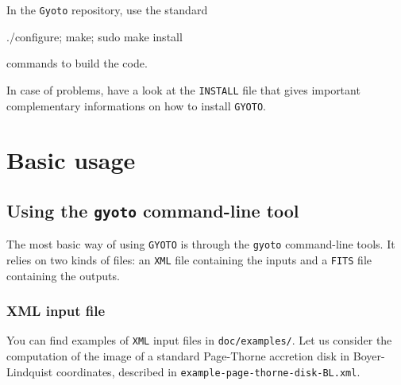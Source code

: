 \documentclass[a4paper,12pt]{article}
\begin{document}
In the \texttt{Gyoto} repository, use the standard 
\begin{code}
./configure; make; sudo make install 
\end{code}
commands
to build the code.

In case of problems, have a look at the \texttt{INSTALL} file that gives important complementary informations on how to install \texttt{GYOTO}.

\section{Basic usage}
\subsection{Using the \texttt{gyoto} command-line tool}
\label{demo}

The most basic way of using \texttt{GYOTO} is through the
\texttt{gyoto} command-line tools. It relies on two kinds of files: an
\texttt{XML} file containing the inputs and a \texttt{FITS} file
containing the outputs.

\subsubsection{XML input file}

You can find examples of \texttt{XML} input files in \texttt{doc/examples/}. Let us consider the computation of the image of a standard Page-Thorne accretion disk in Boyer-Lindquist coordinates, described in \texttt{example-page-thorne-disk-BL.xml}. 
\end{document}
